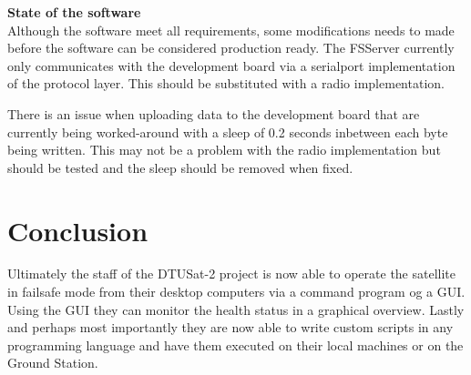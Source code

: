 \textbf{State of the software} \\
Although the software meet all requirements, some modifications needs to made before the software can be considered production ready.
The FSServer currently only communicates with the development board via a serialport implementation of the protocol layer. This should be substituted with a radio implementation.

There is an issue when uploading data to the development board that are currently being worked-around with a sleep of 0.2 seconds inbetween each byte being written. This may not be a problem with the radio implementation but should be tested and the sleep should be removed when fixed.

\section{Conclusion}
Ultimately the staff of the DTUSat-2 project is now able to operate the satellite in failsafe mode from their desktop computers via a command program og a GUI. Using the GUI they can monitor the health status in a graphical overview. Lastly and perhaps most importantly they are now able to write custom scripts in any programming language and have them executed on their local machines or on the Ground Station.
